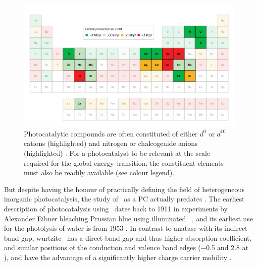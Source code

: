 \documentclass[webedition,openright,titles,swedish,english]{LuaUUThesis}\usepackage[]{graphicx}\usepackage[]{xcolor}
\newenvironment{knitrout}{}{} %
\begin{document}
%

\begin{figure}[tbp]
\begin{knitrout}\scriptsize
{}\color{fgcolor}

{\centering \includegraphics[width=4.72in]{figure/0100-fig-elements-photocatalysis-1} 

}


\end{knitrout}
\caption[Chemical elements in photocatalytic compounds]{%
   Photocatalytic compounds are often constituted of either
   $d^0$ or $d^{10}$ cations (highlighted) and nitrogen or chalcogenide anions
   (highlighted) \cite{Zhu2011,Maeda2011}.
   For a photocatalyst to be relevant at the scale required for the global energy
   transition, the constituent elements must also be readily available \cite{Vesborg2012}
   (see colour legend).
}
\label{fig:0100-elements-of-photocatalysis}
\end{figure}

But despite  having the honour of practically defining the field of
heterogeneous inorganic photocatalysis, the study of \ZnO\ as a \gls{PC} actually
predates .
The earliest description of photocatalysis using \zincox\ dates back to 1911
in experiments by Alexander Eibner bleaching Prussian blue using
illuminated \ZnO\ \cite{vonEibner1911}, and its earliest use for
the photolysis of water is from 1953 \cite{Markham1953,Markham1955}.
In contrast to anatase  with its indirect band gap,
wurtzite \zincox\ has a direct band gap and thus higher absorption coefficient,
and similar positions of the conduction and valence band edges
(\qty{-0.5}{\voltNHE} and \qty{+2.8}{\voltNHE} at ),
and have the advantage of a significantly higher charge carrier mobility
\cite{Boschloo2006,Jacobsson2012a}.
\end{document}
